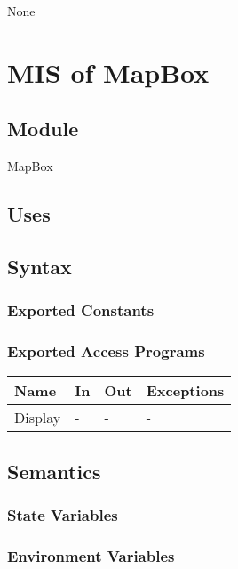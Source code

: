 \documentclass[12pt, titlepage]{article}
\begin{document}
\begin{itemize}
None

\newpage

\section{MIS of MapBox} \label{mMap}

\subsection{Module}

MapBox

\subsection{Uses}

\subsection{Syntax}

\subsubsection{Exported Constants}

\subsubsection{Exported Access Programs}

\begin{center}
\begin{tabular}{p{2cm} p{4cm} p{4cm} p{2cm}}
\hline
\textbf{Name} & \textbf{In} & \textbf{Out} & \textbf{Exceptions} \\
\hline
Display & - & - & - \\

\hline
\end{tabular}
\end{center}

\subsection{Semantics}

\subsubsection{State Variables}

\subsubsection{Environment Variables}


\end{itemize}
\end{document}
